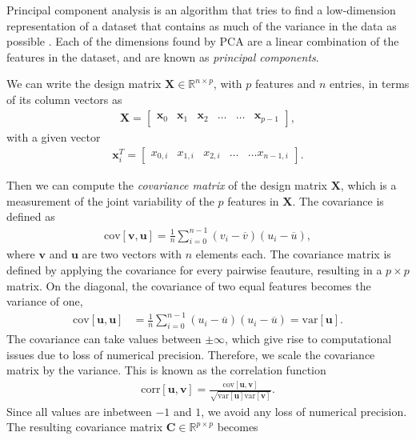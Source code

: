 Principal component analysis is an algorithm that tries to find a low-dimension representation of a dataset that contains as much of the variance in the data as possible \cite{Murphy2012, James2017}. Each of the dimensions found by PCA are a linear combination of the features in the dataset, and are known as \textit{principal components}.

We can write the design matrix $\boldsymbol{X}\in {\mathbb{R}}^{n\times p}$, with $p$ features and $n$ entries, in terms of its column vectors as
\begin{align}
\boldsymbol{X}=\begin{bmatrix} \boldsymbol{x}_0 & \boldsymbol{x}_1 & \boldsymbol{x}_2 & \dots & \dots & \boldsymbol{x}_{p-1}\end{bmatrix},
\label{eq:designmatrix}
\end{align}
with a given vector
\begin{align}
\boldsymbol{x}_i^T = \begin{bmatrix}x_{0,i} & x_{1,i} & x_{2,i}& \dots & \dots x_{n-1,i}\end{bmatrix}.
\label{eq:pc}
\end{align}

\noindent Then we can compute the \textit{covariance matrix} of the design matrix $\boldsymbol{X}$, which is a measurement of the joint variability of the $p$ features in $\boldsymbol{X}$. The covariance is defined as
\begin{align}
\mathrm{cov}[\boldsymbol{v},\boldsymbol{u}] =\frac{1}{n} \sum_{i=0}^{n-1}(v_i- \overline{v})(u_i- \overline{u}),
\end{align}
where $\boldsymbol{v}$ and $\boldsymbol{u}$ are two vectors with $n$ elements each. The covariance matrix is defined by applying the covariance for every pairwise feauture, resulting in a $p\times p$ matrix. On the diagonal, the covariance of two equal features becomes the variance of one,
\begin{align}
  \mathrm{cov}[\boldsymbol{u},\boldsymbol{u}] &=\frac{1}{n} \sum_{i=0}^{n-1}(u_i- \overline{u})(u_i- \overline{u}) = \mathrm{var}[\boldsymbol{u}].
\end{align}
The covariance can take values between $\pm \infty$, which give rise to computational issues due to loss of numerical precision. Therefore, we scale the covariance matrix by the variance. This is known as the correlation function
\begin{align}
  \mathrm{corr}[\boldsymbol{u},\boldsymbol{v}]=\frac{\mathrm{cov}[\boldsymbol{u},\boldsymbol{v}]}{\sqrt{\mathrm{var}[\boldsymbol{u}] \mathrm{var}[\boldsymbol{v}]}}.
\end{align}
Since all values are inbetween $-1$ and $1$, we avoid any loss of numerical precision. The resulting covariance matrix $\boldsymbol{C} \in {\mathbb{R}}^{p\times p}$ becomes

